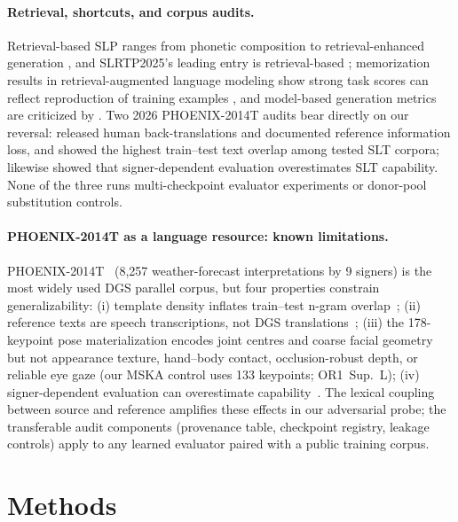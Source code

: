 \documentclass[pdflatex,sn-chicago]{sn-jnl}
\begin{document}
\paragraph{Retrieval, shortcuts, and corpus audits.}
Retrieval-based SLP ranges from phonetic composition to retrieval-enhanced generation \cite{walsh2024datadriven,signstitching,soke,darslp}, and SLRTP2025's leading entry is retrieval-based \cite{slrtp2025}; memorization results in retrieval-augmented language modeling show strong task scores can reflect reproduction of training examples \cite{carlini2021extracting,kandpal2022memorization,khandelwal2020knnlm}, and model-based generation metrics are criticized by \cite{yazdani2025critical,backtranslation2,he2023blind}. Two 2026 PHOENIX-2014T audits bear directly on our reversal: \citet{czehmann2026sacred} released human back-translations and documented reference information loss, and \citet{alkain2026critical} showed the highest train--test text overlap among tested SLT corpora; \citet{artiaga2025signer} likewise showed that signer-dependent evaluation overestimates SLT capability. None of the three runs multi-checkpoint evaluator experiments or donor-pool substitution controls.

\paragraph{PHOENIX-2014T as a language resource: known limitations.}
PHOENIX-2014T~\cite{camgoz2018neural} (8,257 weather-forecast interpretations by 9 signers) is the most widely used DGS parallel corpus, but four properties constrain generalizability: (i) template density inflates train--test n-gram overlap~\cite{alkain2026critical}; (ii) reference texts are speech transcriptions, not DGS translations~\cite{czehmann2026sacred}; (iii) the 178-keypoint pose materialization encodes joint centres and coarse facial geometry but not appearance texture, hand--body contact, occlusion-robust depth, or reliable eye gaze (our MSKA control uses 133 keypoints; OR1~Sup.~L); (iv) signer-dependent evaluation can overestimate capability~\cite{artiaga2025signer}. The lexical coupling between source and reference amplifies these effects in our adversarial probe; the transferable audit components (provenance table, checkpoint registry, leakage controls) apply to any learned evaluator paired with a public training corpus.

\section{Methods}
\label{sec:method}
\end{document}
